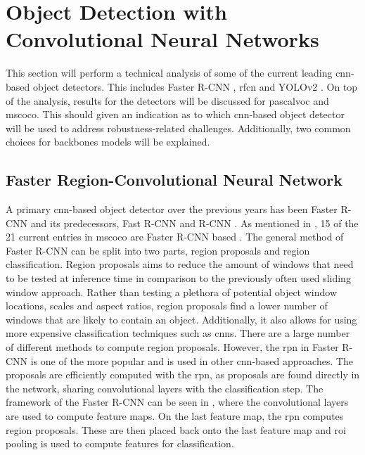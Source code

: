 \section{Object Detection with Convolutional Neural Networks}\label{sec:objdet}
This section will perform a technical analysis of some of the current leading \gls{cnn}-based object detectors. This includes Faster R-CNN \cite{fasterrcnn}, \gls{rfcn} \cite{rfcn} and YOLOv2 \cite{yolov2}. On top of the analysis, results for the detectors will be discussed for \gls{pascalvoc} and \gls{mscoco}. This should given an indication as to which \gls{cnn}-based object detector will be used to address robustness-related challenges. Additionally, two common choices for backbones models will be explained.

\subsection{Faster Region-Convolutional Neural Network}
A primary \gls{cnn}-based object detector over the previous years has been Faster R-CNN \cite{fasterrcnn} and its predecessors, Fast R-CNN \cite{fastrcnn} and R-CNN \cite{rcnn}. As mentioned in , 15 of the 21 current entries in \gls{mscoco} are Faster R-CNN based \cite{cocolead}. The general method of Faster R-CNN can be split into two parts, region proposals and region classification. Region proposals aims to reduce the amount of windows that need to be tested at inference time in comparison to the previously often used sliding window approach. Rather than testing a plethora of potential object window locations, scales and aspect ratios, region proposals find a lower number of windows that are likely to contain an object. Additionally, it also allows for using more expensive classification techniques such as \glspl{cnn}. There are a large number of different methods to compute region proposals. However, the \gls{rpn} in Faster R-CNN is one of the more popular and is used in other \gls{cnn}-based approaches. The proposals are efficiently computed with the \gls{rpn}, as proposals are found directly in the network, sharing convolutional layers with the classification step. The framework of the Faster R-CNN can be seen in , where the convolutional layers are used to compute feature maps. On the last feature map, the \gls{rpn} computes region proposals. These are then placed back onto the last feature map and \gls{roi} pooling is used to compute features for classification.

